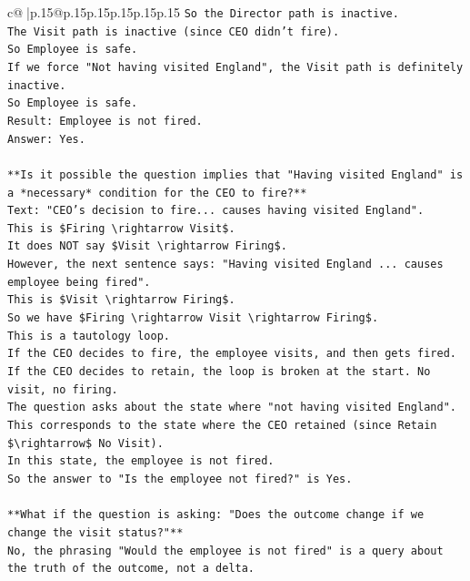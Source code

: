 \documentclass{article}
\begin{document}
{\begin{supertabular}{c@{$\;$}|p{.15\linewidth}@{}p{.15\linewidth}p{.15\linewidth}p{.15\linewidth}p{.15\linewidth}p{.15\linewidth}}
{{{\texttt{So the Director path is inactive.} \\
\texttt{The Visit path is inactive (since CEO didn't fire).} \\
\texttt{So Employee is safe.} \\
\texttt{If we force "Not having visited England", the Visit path is definitely inactive.} \\
\texttt{So Employee is safe.} \\
\texttt{Result: Employee is not fired.} \\
\texttt{Answer: Yes.} \\
\\ 
\texttt{**Is it possible the question implies that "Having visited England" is a *necessary* condition for the CEO to fire?**} \\
\texttt{Text: "CEO's decision to fire... causes having visited England".} \\
\texttt{This is \$Firing \textbackslash{}rightarrow Visit\$.} \\
\texttt{It does NOT say \$Visit \textbackslash{}rightarrow Firing\$.} \\
\texttt{However, the next sentence says: "Having visited England ... causes employee being fired".} \\
\texttt{This is \$Visit \textbackslash{}rightarrow Firing\$.} \\
\texttt{So we have \$Firing \textbackslash{}rightarrow Visit \textbackslash{}rightarrow Firing\$.} \\
\texttt{This is a tautology loop.} \\
\texttt{If the CEO decides to fire, the employee visits, and then gets fired.} \\
\texttt{If the CEO decides to retain, the loop is broken at the start. No visit, no firing.} \\
\texttt{The question asks about the state where "not having visited England".} \\
\texttt{This corresponds to the state where the CEO retained (since Retain \$\textbackslash{}rightarrow\$ No Visit).} \\
\texttt{In this state, the employee is not fired.} \\
\texttt{So the answer to "Is the employee not fired?" is Yes.} \\
\\ 
\texttt{**What if the question is asking: "Does the outcome change if we change the visit status?"**} \\
\texttt{No, the phrasing "Would the employee is not fired" is a query about the truth of the outcome, not a delta.} \\
}}}
\end{supertabular}}
\end{document}
